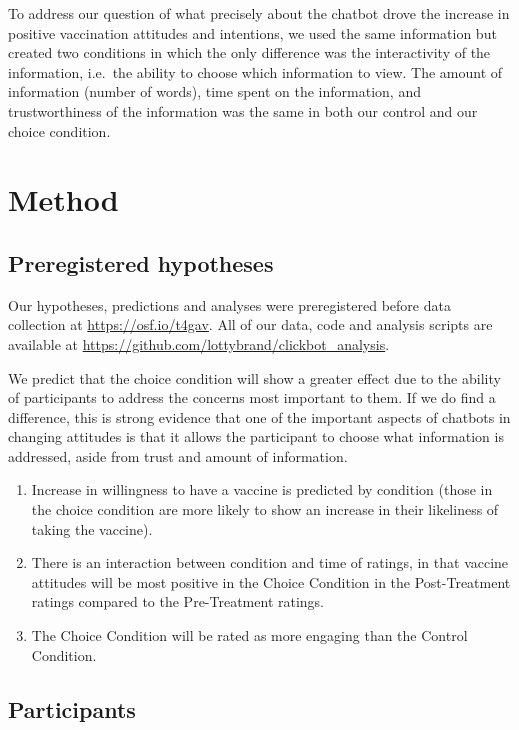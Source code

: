 \documentclass[english,,jou,floatsintext]{apa6}
\begin{document}
To address our question of what precisely about the chatbot drove the increase in positive vaccination attitudes and intentions, we used the same information but created two conditions in which the only difference was the interactivity of the information, i.e.~the ability to choose which information to view. The amount of information (number of words), time spent on the information, and trustworthiness of the information was the same in both our control and our choice condition.

\hypertarget{method}{%
\section{Method}\label{method}}

\hypertarget{preregistered-hypotheses}{%
\subsection{Preregistered hypotheses}\label{preregistered-hypotheses}}

Our hypotheses, predictions and analyses were preregistered before data collection at \url{https://osf.io/t4gav}. All of our data, code and analysis scripts are available at \url{https://github.com/lottybrand/clickbot_analysis}.

We predict that the choice condition will show a greater effect due to the ability of participants to address the concerns most important to them. If we do find a difference, this is strong evidence that one of the important aspects of chatbots in changing attitudes is that it allows the participant to choose what information is addressed, aside from trust and amount of information.

\begin{enumerate}
\def\labelenumi{\arabic{enumi})}
\item
  Increase in willingness to have a vaccine is predicted by condition (those in the choice condition are more likely to show an increase in their likeliness of taking the vaccine).
\item
  There is an interaction between condition and time of ratings, in that vaccine attitudes will be most positive in the Choice Condition in the Post-Treatment ratings compared to the Pre-Treatment ratings.
\item
  The Choice Condition will be rated as more engaging than the Control Condition.
\end{enumerate}

\hypertarget{participants}{%
\subsection{Participants}\label{participants}}
\end{document}
